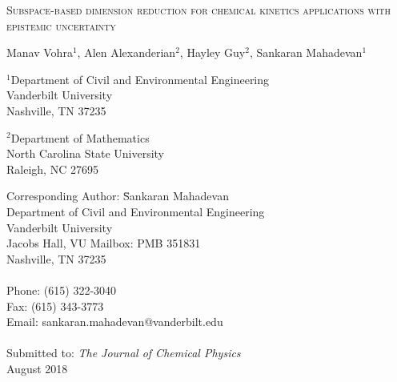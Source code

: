 \begin{center}
\textsc{Subspace-based dimension reduction for chemical kinetics applications with epistemic uncertainty}

\bigskip 
\bigskip 

Manav Vohra$^{1}$, Alen Alexanderian$^{2}$, Hayley Guy$^{2}$, Sankaran Mahadevan$^{1}$

\bigskip
\bigskip

\normalsize
$^1$Department of Civil and Environmental Engineering\\
Vanderbilt University\\
Nashville, TN 37235\\

\bigskip

$^2$Department of Mathematics\\
North Carolina State University\\
Raleigh, NC 27695\\

\bigskip

\end{center}

\vspace{6cm}

\begin{tabbing}
Corresponding Author: \hspace{5mm} \= Sankaran Mahadevan\\
       \>  Department of Civil and Environmental Engineering\\
       \>  Vanderbilt University\\
        Jacobs Hall, VU Mailbox: PMB 351831 \\
       \>  Nashville, TN 37235 \\
       \> \\
Phone: \> (615) 322-3040 \\
Fax:   \> (615) 343-3773 \\
Email: \>  sankaran.mahadevan@vanderbilt.edu   \\
\\
Submitted to: \> \textit{The Journal of Chemical Physics} \\
\>  August 2018\\

\bigskip
\end{tabbing}

\clearpage

